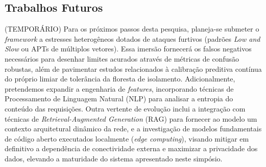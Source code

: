 \documentclass[sigconf, anonymous]{acmart}
\begin{document}
\subsection{Trabalhos Futuros} 
(TEMPORÁRIO)
Para os próximos passos desta pesquisa, planeja-se submeter o \textit{framework} a estresses heterogêneos dotados de ataques furtivos (padrões \textit{Low and Slow} ou APTs de múltiplos vetores). Essa imersão fornecerá os falsos negativos necessários para desenhar limites acurados através de métricas de confusão robustas, além de pavimentar estudos relacionados à calibração preditiva contínua do próprio limiar de tolerância da floresta de isolamento. Adicionalmente, pretendemos expandir a engenharia de \textit{features}, incorporando técnicas de Processamento de Linguagem Natural (NLP) para analisar a entropia do conteúdo das requisições. Outra vertente de evolução inclui a integração com técnicas de \textit{Retrieval-Augmented Generation} (RAG) para fornecer ao modelo um contexto arquitetural dinâmico da rede, e a investigação de modelos fundamentais de código aberto executados localmente (\textit{edge computing}), visando mitigar em definitivo a dependência de conectividade externa e maximizar a privacidade dos dados, elevando a maturidade do sistema apresentado neste simpósio.



\end{document}
